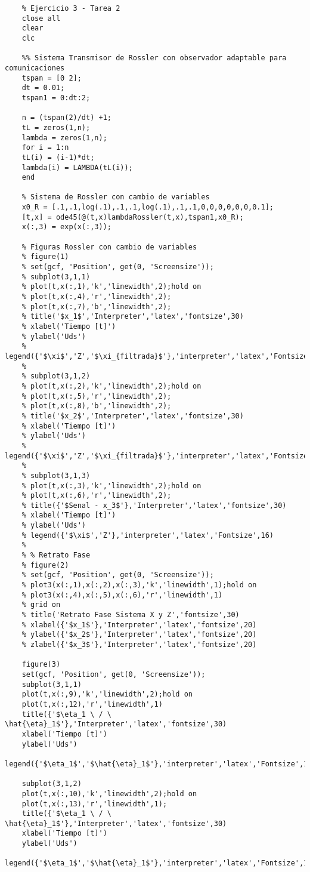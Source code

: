 	\begin{verbatim}
	% Ejercicio 3 - Tarea 2
	close all
	clear
	clc
	
	%% Sistema Transmisor de Rossler con observador adaptable para comunicaciones
	tspan = [0 2];
	dt = 0.01;
	tspan1 = 0:dt:2;
	
	n = (tspan(2)/dt) +1;
	tL = zeros(1,n);
	lambda = zeros(1,n);
	for i = 1:n
	tL(i) = (i-1)*dt;
	lambda(i) = LAMBDA(tL(i));
	end
	
	% Sistema de Rossler con cambio de variables
	x0_R = [.1,.1,log(.1),.1,.1,log(.1),.1,.1,0,0,0,0,0,0,0.1];
	[t,x] = ode45(@(t,x)lambdaRossler(t,x),tspan1,x0_R);
	x(:,3) = exp(x(:,3));
	
	% Figuras Rossler con cambio de variables
	% figure(1)
	% set(gcf, 'Position', get(0, 'Screensize'));
	% subplot(3,1,1)
	% plot(t,x(:,1),'k','linewidth',2);hold on
	% plot(t,x(:,4),'r','linewidth',2);
	% plot(t,x(:,7),'b','linewidth',2);
	% title('$x_1$','Interpreter','latex','fontsize',30)
	% xlabel('Tiempo [t]')
	% ylabel('Uds')
	% legend({'$\xi$','Z','$\xi_{filtrada}$'},'interpreter','latex','Fontsize',16)
	% 
	% subplot(3,1,2)
	% plot(t,x(:,2),'k','linewidth',2);hold on
	% plot(t,x(:,5),'r','linewidth',2);
	% plot(t,x(:,8),'b','linewidth',2);
	% title('$x_2$','Interpreter','latex','fontsize',30)
	% xlabel('Tiempo [t]')
	% ylabel('Uds')
	% legend({'$\xi$','Z','$\xi_{filtrada}$'},'interpreter','latex','Fontsize',16)
	% 
	% subplot(3,1,3)
	% plot(t,x(:,3),'k','linewidth',2);hold on
	% plot(t,x(:,6),'r','linewidth',2);
	% title({'$Senal - x_3$'},'Interpreter','latex','fontsize',30)
	% xlabel('Tiempo [t]')
	% ylabel('Uds')
	% legend({'$\xi$','Z'},'interpreter','latex','Fontsize',16)
	% 
	% % Retrato Fase
	% figure(2)
	% set(gcf, 'Position', get(0, 'Screensize'));
	% plot3(x(:,1),x(:,2),x(:,3),'k','linewidth',1);hold on
	% plot3(x(:,4),x(:,5),x(:,6),'r','linewidth',1)
	% grid on
	% title('Retrato Fase Sistema X y Z','fontsize',30)
	% xlabel({'$x_1$'},'Interpreter','latex','fontsize',20)
	% ylabel({'$x_2$'},'Interpreter','latex','fontsize',20)
	% zlabel({'$x_3$'},'Interpreter','latex','fontsize',20)
	
	figure(3)
	set(gcf, 'Position', get(0, 'Screensize'));
	subplot(3,1,1)
	plot(t,x(:,9),'k','linewidth',2);hold on
	plot(t,x(:,12),'r','linewidth',1)
	title({'$\eta_1 \ / \ \hat{\eta}_1$'},'Interpreter','latex','fontsize',30)
	xlabel('Tiempo [t]')
	ylabel('Uds')
	legend({'$\eta_1$','$\hat{\eta}_1$'},'interpreter','latex','Fontsize',16)
	
	subplot(3,1,2)
	plot(t,x(:,10),'k','linewidth',2);hold on
	plot(t,x(:,13),'r','linewidth',1);
	title({'$\eta_1 \ / \ \hat{\eta}_1$'},'Interpreter','latex','fontsize',30)
	xlabel('Tiempo [t]')
	ylabel('Uds')
	legend({'$\eta_1$','$\hat{\eta}_1$'},'interpreter','latex','Fontsize',16)
	

\end{verbatim}
